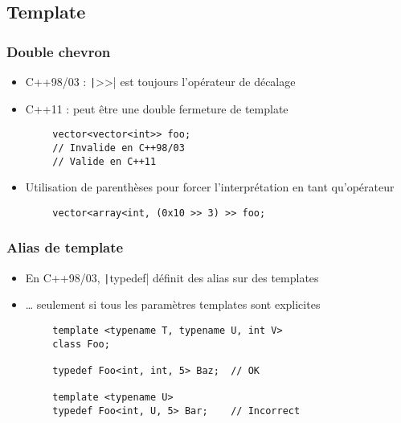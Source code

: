 \documentclass[C++.tex]{subfiles}
\begin{document}
\subsection*{Template}
\begin{frame}[fragile]
	\frametitle{Double chevron}
	\begin{itemize}
		\item C++98/03 : \texttt|>>| est toujours l'opérateur de décalage
		\item C++11 : peut être une double fermeture de template
	\end{itemize}

	\begin{verbatim}
		vector<vector<int>> foo;
		// Invalide en C++98/03
		// Valide en C++11
	\end{verbatim}


	\begin{itemize}
		\item Utilisation de parenthèses pour forcer l'interprétation en tant qu'opérateur
	\end{itemize}

	\begin{verbatim}
		vector<array<int, (0x10 >> 3) >> foo;
	\end{verbatim}

\end{frame}

\begin{frame}[fragile]
	\frametitle{Alias de template}
	\begin{itemize}
		\item En C++98/03, \texttt|typedef| définit des alias sur des templates
		\item \ldots{} seulement si tous les paramètres templates sont explicites
	\end{itemize}

	\begin{verbatim}
		template <typename T, typename U, int V>
		class Foo;

		typedef Foo<int, int, 5> Baz;  // OK

		template <typename U>
		typedef Foo<int, U, 5> Bar;    // Incorrect
	\end{verbatim}

\end{frame}
\end{document}

